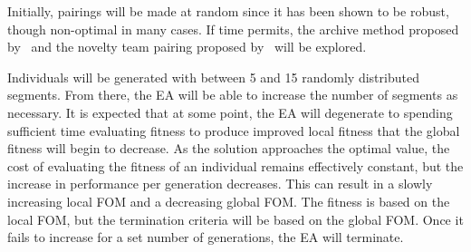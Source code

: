 \documentclass{article}
\begin{document}
Initially, pairings will be made at random since it has been shown to be robust, though non-optimal in many cases. If time permits, the archive method proposed by~\cite{ref:Panait2006} and the novelty team pairing proposed by~\cite{ref:Gomes2014} will be explored.



Individuals will be generated with between 5 and 15 randomly distributed segments. From there, the EA will be able to increase the number of segments as necessary. It is expected that at some point, the EA will degenerate to spending sufficient time evaluating fitness to produce improved local fitness that the global fitness will begin to decrease. As the solution approaches the optimal value, the cost of evaluating the fitness of an individual remains effectively constant, but the increase in performance per generation decreases. This can result in a slowly increasing local FOM and a decreasing global FOM. The fitness is based on the local FOM, but the termination criteria will be based on the global FOM. Once it fails to increase for a set number of generations, the EA will terminate.





\end{document}

